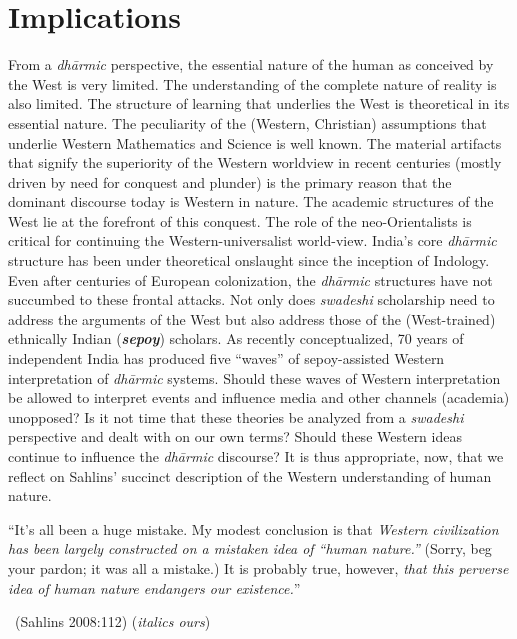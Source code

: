 \section*{Implications}

From a \textit{dhārmic} perspective, the essential nature of the human as conceived by the West is very limited. The understanding of the complete nature of reality is also limited. The structure of learning that underlies the West is theoretical in its essential nature. The peculiarity of the (Western, Christian) assumptions that underlie Western Mathematics and Science is well known. The material artifacts that signify the superiority of the Western worldview in recent centuries (mostly driven by need for conquest and plunder) is the primary reason that the dominant discourse today is Western in nature. The academic structures of the West lie at the forefront of this conquest. The role of the neo-Orientalists is critical for continuing the Western-universalist world-view. India's core \textit{dhārmic} structure has been under theoretical onslaught since the inception of Indology. Even after centuries of European colonization, the \textit{dhārmic} structures have not succumbed to these frontal attacks. Not only does \textit{swadeshi} scholarship need to address the arguments of the West but also address those of the (West-trained) ethnically Indian (\textbf{\textit{sepoy}}) scholars. As recently conceptualized, 70 years of independent India has produced five “waves” of sepoy-assisted Western interpretation of \textit{dhārmic} systems. Should these waves of Western interpretation be allowed to interpret events and influence media and other channels (academia) unopposed? Is it not time that these theories be analyzed from a \textit{swadeshi} perspective and dealt with on our own terms? Should these Western ideas continue to influence the \textit{dhārmic} discourse? It is thus appropriate, now, that we reflect on Sahlins' succinct description of the Western understanding of human nature.

\begin{myquote}
“It's all been a huge mistake. My modest conclusion is that \textit{Western civilization has been largely constructed on a mistaken idea of “human nature.”} (Sorry, beg your pardon; it was all a mistake.) It is probably true, however, \textit{that this perverse idea of human nature endangers our existence.}” 

~\hfill (Sahlins 2008:112) (\textit{italics ours})
\end{myquote}


